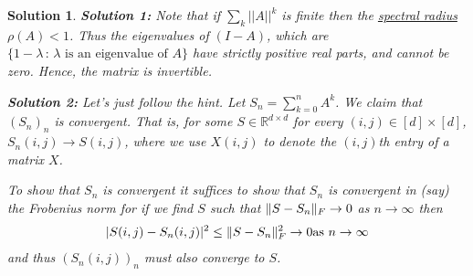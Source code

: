 \documentclass{article}
\newcommand{\R}{\mathbb{R}}
\DeclareMathOperator*{\1}{\mathbbm{1}}
\newtheorem*{solution*}{Solution}
\begin{document}
\begin{solution*}
\textbf{Solution 1:} 
Note that if $\sum_k ||A||^k$ is finite then  the \href{https://en.wikipedia.org/wiki/Spectral_radius}{spectral radius} $\rho(A) < 1$. Thus the eigenvalues of $(I - A)$, which are $\{1-\lambda \,:\, \lambda \text{ is an eigenvalue of } A \}$ have strictly positive real parts, and cannot be zero. Hence, the matrix is invertible. 

\textbf{Solution 2:} Let's just follow the hint.
Let $S_n = \sum_{k=0}^n A^k$.
We claim that $(S_n)_n$ is convergent.
That is, for some $S\in \R^{d\times d}$ for every $(i,j)\in [d]\times [d]$, $S_n(i,j) \to S(i,j)$, where we use $X(i,j)$ to denote the $(i,j)$th entry of a matrix $X$.

To show that $S_n$ is convergent it suffices to show that $S_n$ is convergent in (say) the Frobenius norm for if we find $S$ such that $\|S-S_n\|_F\to 0$ as $n\to \infty$ then 
\begin{align*}
|S(i,j) - S_n(i,j)|^2 \le \| S - S_n \|^2_F \to 0 \text{as } n\to\infty
\end{align*}
and thus $(S_n(i,j))_n$ must also converge to $S$.



\end{solution*}
\end{document}
